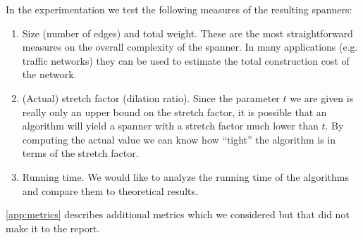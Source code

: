 \documentclass[a4paper,twoside,11pt,hidelinks]{article}
\theoremstyle{plain}
\theoremstyle{definition}  %
\begin{document}
In the experimentation we test the following measures of the resulting spanners:

\begin{enumerate}
	\item Size (number of edges) and total weight. These are the most straightforward measures on the overall complexity of the spanner. In many applications (e.g. traffic networks) they can be used to estimate the total construction cost of the network.

	\item (Actual) stretch factor (dilation ratio). Since the parameter $t$ we are given is really only an upper bound on the stretch factor, it is possible that an algorithm will yield a spanner with a stretch factor much lower than $t$. By computing the actual value we can know how ``tight'' the algorithm is in terms of the stretch factor.

    \item Running time. We would like to analyze the running time of the algorithms and compare them to theoretical results.
\end{enumerate}

\autoref{app:metrics} describes additional metrics which we considered but that did not make it to the report.
\end{document}

